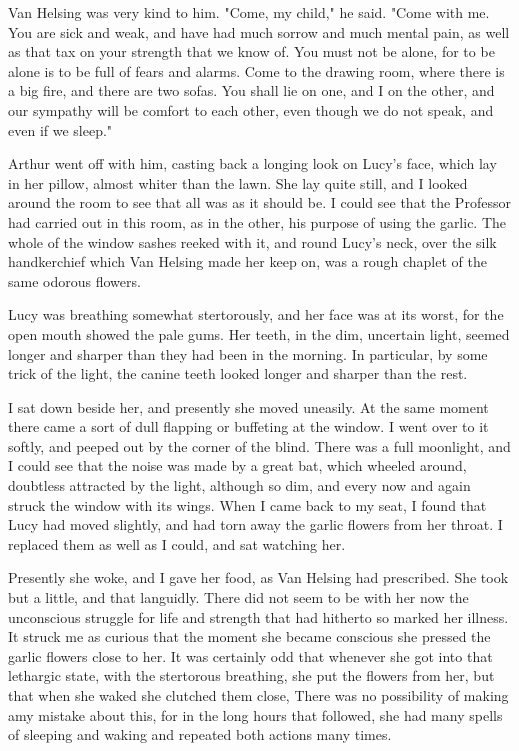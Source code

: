 Van Helsing was very kind to him. "Come, my child," he said. "Come with me. You are sick and weak, and have had much sorrow and much mental pain, as well as that tax on your strength that we know of. You must not be alone, for to be alone is to be full of fears and alarms. Come to the drawing room, where there is a big fire, and there are two sofas. You shall lie on one, and I on the other, and our sympathy will be comfort to each other, even though we do not speak, and even if we sleep." 

Arthur went off with him, casting back a longing look on Lucy's face, which lay in her pillow, almost whiter than the lawn. She lay quite still, and I looked around the room to see that all was as it should be. I could see that the Professor had carried out in this room, as in the other, his purpose of using the garlic. The whole of the window sashes reeked with it, and round Lucy's neck, over the silk handkerchief which Van Helsing made her keep on, was a rough chaplet of the same odorous flowers. 

Lucy was breathing somewhat stertorously, and her face was at its worst, for the open mouth showed the pale gums. Her teeth, in the dim, uncertain light, seemed longer and sharper than they had been in the morning. In particular, by some trick of the light, the canine teeth looked longer and sharper than the rest. 

I sat down beside her, and presently she moved uneasily. At the same moment there came a sort of dull flapping or buffeting at the window. I went over to it softly, and peeped out by the corner of the blind. There was a full moonlight, and I could see that the noise was made by a great bat, which wheeled around, doubtless attracted by the light, although so dim, and every now and again struck the window with its wings. When I came back to my seat, I found that Lucy had moved slightly, and had torn away the garlic flowers from her throat. I replaced them as well as I could, and sat watching her. 

Presently she woke, and I gave her food, as Van Helsing had prescribed. She took but a little, and that languidly. There did not seem to be with her now the unconscious struggle for life and strength that had hitherto so marked her illness. It struck me as curious that the moment she became conscious she pressed the garlic flowers close to her. It was certainly odd that whenever she got into that lethargic state, with the stertorous breathing, she put the flowers from her, but that when she waked she clutched them close, There was no possibility of making amy mistake about this, for in the long hours that followed, she had many spells of sleeping and waking and repeated both actions many times. 


